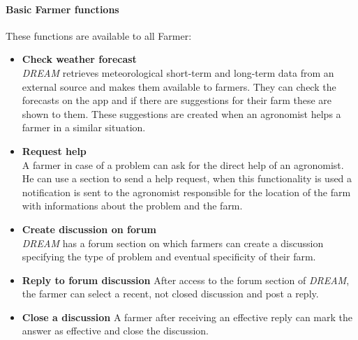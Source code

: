 \paragraph{Basic Farmer functions} These functions are available to all Farmer:
\begin{itemize}
    
    \item \textbf{Check weather forecast}\\
          \emph{DREAM} retrieves meteorological short-term and long-term data from an external source and makes them available 
          to farmers. They can check the forecasts on the app and if there are suggestions for their farm these are shown to them.
           These suggestions are created when an agronomist helps a farmer in a similar situation.
    \item \textbf{Request help}\\
          A farmer in case of a problem can ask for the direct help of an agronomist. He can use a section to send a help request,
           when this functionality is used a notification is sent to the agronomist responsible for the location of the farm with informations about the problem and the farm.
    \item \textbf{Create discussion on forum}\\
         \emph{DREAM} has a forum section on which farmers can create a discussion specifying the type of problem and eventual specificity of their farm. 
    \item \textbf{Reply to forum discussion}
        After access to the forum section of \emph{DREAM}, the farmer can select a recent, not closed discussion and post a reply.
    \item \textbf{Close a discussion}
        A farmer after receiving an effective reply can mark the answer as effective and close the discussion.
\end{itemize}